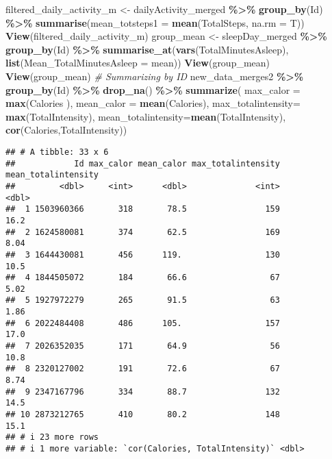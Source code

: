 \documentclass[
]{article}
\newenvironment{Shaded}{\begin{snugshade}}{\end{snugshade}}
\newcommand{\AttributeTok}[1]{\textcolor[rgb]{0.13,0.29,0.53}{#1}}
\newcommand{\CommentTok}[1]{\textcolor[rgb]{0.56,0.35,0.01}{\textit{#1}}}
\newcommand{\FunctionTok}[1]{\textcolor[rgb]{0.13,0.29,0.53}{\textbf{#1}}}
\newcommand{\NormalTok}[1]{#1}
\newcommand{\OtherTok}[1]{\textcolor[rgb]{0.56,0.35,0.01}{#1}}
\newcommand{\SpecialCharTok}[1]{\textcolor[rgb]{0.81,0.36,0.00}{\textbf{#1}}}
\begin{document}
\begin{Shaded}
\begin{Highlighting}[]
\NormalTok{filtered\_daily\_activity\_m }\OtherTok{\textless{}{-}}\NormalTok{ dailyActivity\_merged }\SpecialCharTok{\%\textgreater{}\%}
  \FunctionTok{group\_by}\NormalTok{(Id) }\SpecialCharTok{\%\textgreater{}\%}
  \FunctionTok{summarise}\NormalTok{(}\AttributeTok{mean\_totsteps1 =} \FunctionTok{mean}\NormalTok{(TotalSteps, }\AttributeTok{na.rm =}\NormalTok{ T))}
\FunctionTok{View}\NormalTok{(filtered\_daily\_activity\_m)}
\NormalTok{group\_mean }\OtherTok{\textless{}{-}}\NormalTok{ sleepDay\_merged }\SpecialCharTok{\%\textgreater{}\%}
    \FunctionTok{group\_by}\NormalTok{(Id) }\SpecialCharTok{\%\textgreater{}\%}
   \FunctionTok{summarise\_at}\NormalTok{(}\FunctionTok{vars}\NormalTok{(TotalMinutesAsleep),}
               \FunctionTok{list}\NormalTok{(}\AttributeTok{Mean\_TotalMinutesAsleep =}\NormalTok{ mean))}
\FunctionTok{View}\NormalTok{(group\_mean)}
\FunctionTok{View}\NormalTok{(group\_mean)}
\CommentTok{\# Summarizing by ID }
\NormalTok{new\_data\_merges2 }\SpecialCharTok{\%\textgreater{}\%} 
  \FunctionTok{group\_by}\NormalTok{(Id) }\SpecialCharTok{\%\textgreater{}\%} 
  \FunctionTok{drop\_na}\NormalTok{() }\SpecialCharTok{\%\textgreater{}\%} 
  \FunctionTok{summarize}\NormalTok{( }\AttributeTok{max\_calor =} \FunctionTok{max}\NormalTok{(Calories ), }\AttributeTok{mean\_calor =} \FunctionTok{mean}\NormalTok{(Calories), }\AttributeTok{max\_totalintensity=} \FunctionTok{max}\NormalTok{(TotalIntensity), }\AttributeTok{mean\_totalintensity=}\FunctionTok{mean}\NormalTok{(TotalIntensity), }\FunctionTok{cor}\NormalTok{(Calories,TotalIntensity))}
\end{Highlighting}
\end{Shaded}

\begin{verbatim}
## # A tibble: 33 x 6
##            Id max_calor mean_calor max_totalintensity mean_totalintensity
##         <dbl>     <int>      <dbl>              <int>               <dbl>
##  1 1503960366       318       78.5                159               16.2 
##  2 1624580081       374       62.5                169                8.04
##  3 1644430081       456      119.                 130               10.5 
##  4 1844505072       184       66.6                 67                5.02
##  5 1927972279       265       91.5                 63                1.86
##  6 2022484408       486      105.                 157               17.0 
##  7 2026352035       171       64.9                 56               10.8 
##  8 2320127002       191       72.6                 67                8.74
##  9 2347167796       334       88.7                132               14.5 
## 10 2873212765       410       80.2                148               15.1 
## # i 23 more rows
## # i 1 more variable: `cor(Calories, TotalIntensity)` <dbl>
\end{verbatim}
\end{document}
